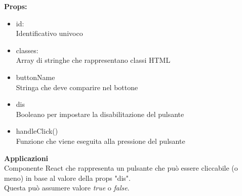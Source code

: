 \textbf{Props:} 
\begin{itemize}
\item id: 
\\
Identificativo univoco 
\item classes: 
\\
Array di stringhe che rappresentano classi HTML
\item buttonName
\\
Stringa che deve comparire nel bottone
\item dis
\\
Booleano per impostare la disabilitazione del pulsante
\item handleClick()
\\
Funzione che viene eseguita alla pressione del pulsante

\end{itemize} 


\textbf{Applicazioni}\\
Componente React che rappresenta un pulsante che può essere cliccabile (o meno) in base al valore della props "dis". \\ Questa può assumere valore \textit{true} o \textit{false}. 


\clearpage

